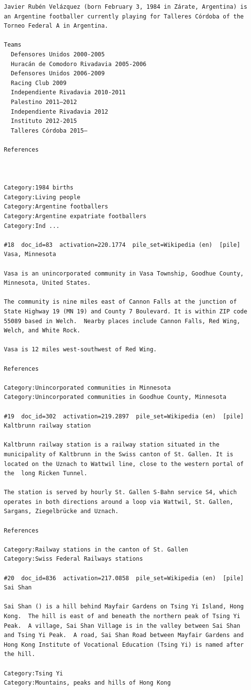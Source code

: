 \begin{verbatim}
Javier Rubén Velázquez (born February 3, 1984 in Zárate, Argentina) is an Argentine footballer currently playing for Talleres Córdoba of the Torneo Federal A in Argentina.

Teams
  Defensores Unidos 2000-2005
  Huracán de Comodoro Rivadavia 2005-2006
  Defensores Unidos 2006-2009
  Racing Club 2009
  Independiente Rivadavia 2010-2011
  Palestino 2011–2012
  Independiente Rivadavia 2012
  Instituto 2012-2015
  Talleres Córdoba 2015–

References
 
 

Category:1984 births
Category:Living people
Category:Argentine footballers
Category:Argentine expatriate footballers
Category:Ind ...

#18  doc_id=83  activation=220.1774  pile_set=Wikipedia (en)  [pile]
Vasa, Minnesota

Vasa is an unincorporated community in Vasa Township, Goodhue County, Minnesota, United States.

The community is nine miles east of Cannon Falls at the junction of State Highway 19 (MN 19) and County 7 Boulevard. It is within ZIP code 55089 based in Welch.  Nearby places include Cannon Falls, Red Wing, Welch, and White Rock.

Vasa is 12 miles west-southwest of Red Wing.

References

Category:Unincorporated communities in Minnesota
Category:Unincorporated communities in Goodhue County, Minnesota

#19  doc_id=302  activation=219.2897  pile_set=Wikipedia (en)  [pile]
Kaltbrunn railway station

Kaltbrunn railway station is a railway station situated in the municipality of Kaltbrunn in the Swiss canton of St. Gallen. It is located on the Uznach to Wattwil line, close to the western portal of the  long Ricken Tunnel.

The station is served by hourly St. Gallen S-Bahn service S4, which operates in both directions around a loop via Wattwil, St. Gallen, Sargans, Ziegelbrücke and Uznach.

References 

Category:Railway stations in the canton of St. Gallen
Category:Swiss Federal Railways stations

#20  doc_id=836  activation=217.0858  pile_set=Wikipedia (en)  [pile]
Sai Shan

Sai Shan () is a hill behind Mayfair Gardens on Tsing Yi Island, Hong Kong.  The hill is east of and beneath the northern peak of Tsing Yi Peak.  A village, Sai Shan Village is in the valley between Sai Shan and Tsing Yi Peak.  A road, Sai Shan Road between Mayfair Gardens and Hong Kong Institute of Vocational Education (Tsing Yi) is named after the hill.

Category:Tsing Yi
Category:Mountains, peaks and hills of Hong Kong

\end{verbatim}

